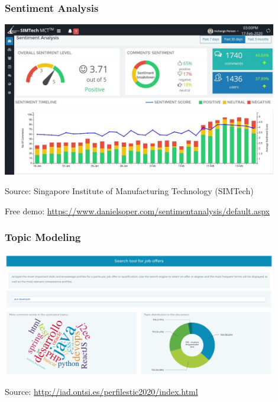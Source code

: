 \documentclass{beamer}
\begin{document}
\begin{frame}

	\frametitle{Sentiment Analysis}

\centerline{\includegraphics[width=12cm]{./figs/sentiment.jpg}}

\tiny
Source: Singapore Institute of Manufacturing Technology (SIMTech)

Free demo: \url{https://www.danielsoper.com/sentimentanalysis/default.aspx}
\end{frame}

\begin{frame}

	\frametitle{Topic Modeling}

\centerline{\includegraphics[width=12cm]{./figs/topic_modeling.png}}

\tiny
Source: \url{http://iad.ontsi.es/perfilestic2020/index.html}
\end{frame}
\end{document}
